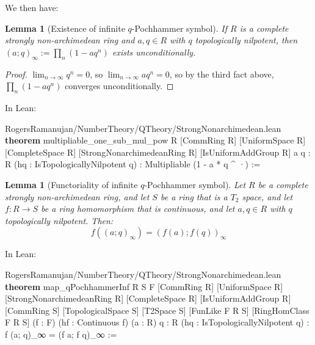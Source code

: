 \documentclass[12pt]{amsart}
\newtheorem{lemma}[theorem]{Lemma}
\theoremstyle{definition}
\theoremstyle{remark}
\numberwithin{equation}{subsection}
\newcommand{\kw}[1]{\textcolor{keywordcolor}{\textbf{#1}}}
\newcommand{\var}[1]{\textcolor{tacticcolor}{#1}}
\newcommand{\num}[1]{\textcolor{numcolor}{#1}}
\newcommand{\imp}[1]{\textcolor{commentcolor}{\textbraceleft#1\textbraceright}}
\begin{document}
We then have:
\begin{lemma}[Existence of infinite $q$-Pochhammer symbol]\label{lem:poch-inf-exists}
    If $R$ is a complete strongly non-archimedean ring and $a, q \in R$ with $q$ topologically nilpotent, then $(a; q)_\infty := \prod_{n} (1 - aq^n)$ exists unconditionally.
\end{lemma}
\begin{proof}
    $\lim_{n \to \infty} q^n = 0$, so $\lim_{n \to \infty} aq^n = 0$, so by the third fact above, $\prod_{n} (1 - aq^n)$ converges unconditionally.
\end{proof}

In Lean:

\begin{code}{RogersRamanujan/NumberTheory/QTheory/StrongNonarchimedean.lean}
\kw{theorem} multipliable_one_sub_mul_pow \imp{R} [CommRing \var{R}] [UniformSpace \var{R}] [CompleteSpace \var{R}]
  [StrongNonarchimedeanRing \var{R}] [IsUniformAddGroup \var{R}]
  \imp{a q : R} (\var{hq} : IsTopologicallyNilpotent \var{q}) :
  Multipliable (\num{1} - \var{a} * \var{q} ^ ·) :=
\end{code}

\begin{lemma}[Functoriality of infinite $q$-Pochhammer symbol]\label{lem:poch-inf-func}
Let $R$ be a complete strongly non-archimedean ring, and let $S$ be a ring that is a $T_2$ space, and let $f: R \to S$ be a ring homomorphism that is continuous, and let $a, q \in R$ with $q$ topologically nilpotent. Then:
\begin{equation}
f\left( (a; q)_\infty \right) = (f(a); f(q))_\infty
\end{equation}
\end{lemma}

In Lean:

\begin{code}{RogersRamanujan/NumberTheory/QTheory/StrongNonarchimedean.lean}
\kw{theorem} map_qPochhammerInf \imp{R S F} [CommRing \var{R}] [UniformSpace \var{R}]
  [StrongNonarchimedeanRing \var{R}] [CompleteSpace \var{R}] [IsUniformAddGroup \var{R}]
  [CommRing \var{S}] [TopologicalSpace \var{S}] [T2Space \var{S}]
  [FunLike \var{F} \var{R} \var{S}] [RingHomClass \var{F} \var{R} \var{S}] (\var{f} : \var{F}) (\var{hf} : Continuous \var{f})
  (\var{a} : \var{R}) \imp{q : R} (\var{hq} : IsTopologicallyNilpotent \var{q}) :
  \var{f} (\var{a}; \var{q})_∞ = (\var{f} \var{a}; \var{f} \var{q})_∞ :=
\end{code}
\end{document}
